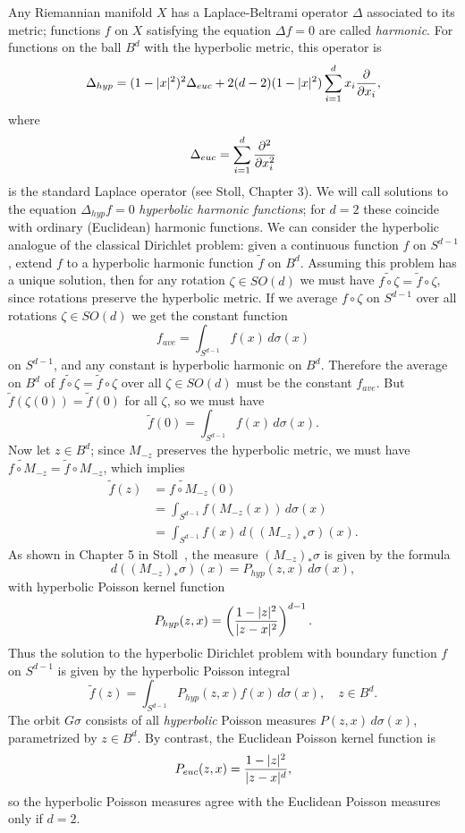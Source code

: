 \documentclass[%
 aip,
 amsmath,amssymb,
 reprint,%
]{revtex4-1}
\begin{document}
Any Riemannian manifold $X$ has a Laplace-Beltrami operator $\Delta$ associated to its metric; functions $f$ on $X$ satisfying the equation $\Delta f = 0$ are called \emph{harmonic}.  For functions on the ball $B^d$ with the hyperbolic metric, this operator is
$$
\Delta_{hyp} = (1-|x|^2)^2 \Delta _{euc} +2(d-2)(1-|x|^2) \sum_{i=1}^d x_i {\partial \over \partial x_i},
$$
where 
$$
\Delta_{euc} = \sum_{i=1}^d {\partial^2 \over \partial x_i^2}
$$
is the standard Laplace operator (see Stoll\cite{s}, Chapter 3).  We will call solutions to the equation $\Delta_{hyp}f = 0$ \emph{hyperbolic harmonic functions}; for $d=2$ these coincide with ordinary (Euclidean) harmonic functions.  We can consider the hyperbolic analogue of the classical Dirichlet problem: given a continuous function $f$ on $S^{d-1}$, extend $f$ to a hyperbolic harmonic function $\tilde f$ on $B^d$.  Assuming this problem has a unique solution, then for any rotation $\zeta \in SO(d)$ we must have $\widetilde {f \circ \zeta} = \tilde f \circ \zeta$, since rotations preserve the hyperbolic metric.  If we average $f \circ \zeta $ on $S^{d-1}$ over all rotations $\zeta \in SO(d)$ we get the constant function
$$
f_{ave}  = \int_{S^{d-1}} f(x) \, d \sigma(x)
$$
on $S^{d-1}$, and any constant is hyperbolic harmonic on $B^d$.  Therefore the average on $B^d$ of $\widetilde {f \circ \zeta}= \tilde f \circ \zeta$ over all $\zeta \in SO(d)$ must be the constant $f_{ave}$.  But  $\tilde f(\zeta (0)) = \tilde f(0)$ for all $\zeta$, so we must have
$$
\tilde f (0) =\int_{S^{d-1}} f(x) \, d \sigma(x).
$$
Now let $z \in B^d$; since $M_{-z}$ preserves the hyperbolic metric, we must have $\widetilde{f \circ M}_{-z}= \tilde f \circ M_{-z}$, which implies
\begin{align*}
\tilde f(z) &= \widetilde{f \circ M}_{-z} (0) 
\\&=  \int_{S^{d-1}} f(M_{-z}(x)) \, d \sigma(x) 
\\&= \int_{S^{d-1}} f(x) \, d ((M_{-z})_\ast \sigma) (x).
\end{align*}
As shown in Chapter 5 in Stoll~\cite{s}, the measure $(M_{-z})_\ast \sigma$ is given by the formula
$$
d((M_{-z})_\ast \sigma) (x) = P_{hyp} (z, x) \, d \sigma (x),
$$
with hyperbolic Poisson kernel function
\begin{equation}
P_{hyp} (z,x) = \left ( {1-|z|^2 \over |z-x|^2 } \right)^{d-1}. 
\label{hyperbolicPoisson}
\end{equation}
Thus the solution to the hyperbolic Dirichlet problem with boundary function $f$ on $S^{d-1}$ is given by the hyperbolic Poisson integral
$$
\tilde f(z) = \int_{S^{d-1}} P_{hyp}(z,x) f(x) \, d \sigma(x), \quad z \in B^d.
$$
The orbit $G \sigma$ consists of all \emph{hyperbolic}  Poisson measures $P(z,x) \, d \sigma (x)$, parametrized by $z \in B^d$.  By contrast, the Euclidean Poisson kernel function is
$$
P_{euc} (z,x) ={1-|z|^2 \over |z-x|^d },
$$
so the hyperbolic Poisson measures agree with the Euclidean Poisson measures only if $d=2$.
\end{document}
